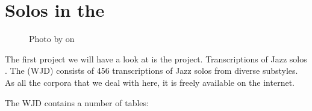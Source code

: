 \documentclass[letterpaper,10pt,english]{sphinxmanual}
\begin{document}
\chapter{Solos in the }
\label{\detokenize{4_jazz_solos:solos-in-the-weimar-jazz-database}}\label{\detokenize{4_jazz_solos::doc}}
\begin{figure}[htbp]
\centering
\capstart

\noindent{}
\caption{Photo by 
on }\label{\detokenize{4_jazz_solos:id3}}\end{figure}

The first project we will have a look at is the  project.
Transcriptions of Jazz solos . The  (WJD) consists of
456 transcriptions of Jazz solos from diverse substyles.
As all the corpora that we deal with here, it is freely available on the internet. %
\begin{footnote}[1]\sphinxAtStartFootnote
{}
%
\end{footnote}

The WJD contains a number of tables:
\end{document}
